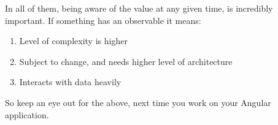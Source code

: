 In all of them, being aware of the value at any given time, is incredibly 
important. If something has an observable it means: 
\begin{enumerate}
  \item Level of complexity is higher 
  \item Subject to change, and needs higher level of architecture
  \item Interacts with data heavily 
\end{enumerate}
 
So keep an eye out for the above, next time you work on your Angular 
application.
